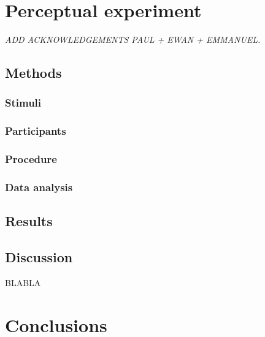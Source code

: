 
\section{Perceptual experiment}
\small{\textit{{\color{red}ADD ACKNOWLEDGEMENTS PAUL + EWAN + EMMANUEL.\\}}}
\subsection{Methods}
\subsubsection{Stimuli}
\subsubsection{Participants}
\subsubsection{Procedure}
\subsubsection{Data analysis}
\subsection{Results}
\subsection{Discussion}

BLABLA
\section{Conclusions}



